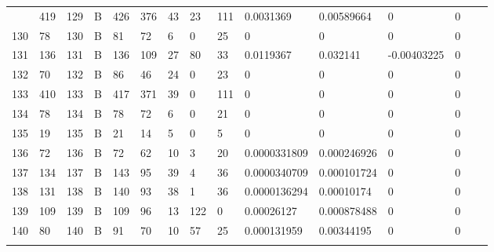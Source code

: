 \begin{longtable}{lllllllllllllll}
\begin{comment}
	129 & 419               & 129 & B   & 426               & 376               & 43                & 23   & 111        & 0.0031369      & 0.00589664     & 0             & 0            \\
	130 & 78                & 130 & B   & 81                & 72                & 6                 & 0    & 25         & 0              & 0              & 0             & 0            \\
	131 & 136               & 131 & B   & 136               & 109               & 27                & 80   & 33         & 0.0119367      & 0.032141       & -0.00403225   & 0            \\
	132 & 70                & 132 & B   & 86                & 46                & 24                & 0    & 23         & 0              & 0              & 0             & 0            \\
	133 & 410               & 133 & B   & 417               & 371               & 39                & 0    & 111        & 0              & 0              & 0             & 0            \\
	134 & 78                & 134 & B   & 78                & 72                & 6                 & 0    & 21         & 0              & 0              & 0             & 0            \\
	135 & 19                & 135 & B   & 21                & 14                & 5                 & 0    & 5          & 0              & 0              & 0             & 0            \\
	136 & 72                & 136 & B   & 72                & 62                & 10                & 3    & 20         & 0.0000331809   & 0.000246926    & 0             & 0            \\
	137 & 134               & 137 & B   & 143               & 95                & 39                & 4    & 36         & 0.0000340709   & 0.000101724    & 0             & 0            \\
	138 & 131               & 138 & B   & 140               & 93                & 38                & 1    & 36         & 0.0000136294   & 0.00010174     & 0             & 0            \\
	139 & 109               & 139 & B   & 109               & 96                & 13                & 122  & 0          & 0.00026127     & 0.000878488    & 0             & 0            \\
	140 & 80                & 140 & B   & 91                & 70                & 10                & 57   & 25         & 0.000131959    & 0.00344195     & 0             & 0            \\

\end{comment}
\end{longtable}
